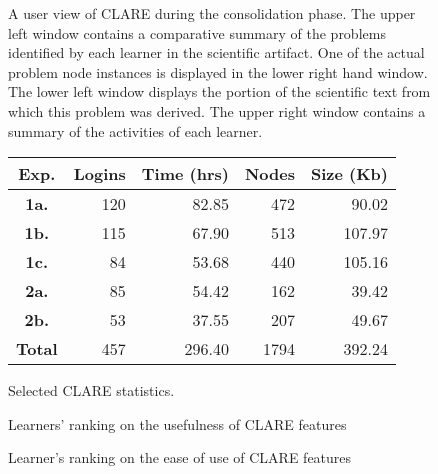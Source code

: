 \newpage
\begin{figure}[h]
  \centerline{}
  \caption{ A user view of CLARE during the consolidation phase.  The upper
  left window contains a comparative summary of the problems identified
  by each learner in the scientific artifact.  One of the actual problem
  node instances is displayed in the lower right hand window.  The lower
  left window displays the portion of the scientific text from which this
  problem was derived. The upper right window contains a summary of the
  activities of each learner.}
  \label{fig:consolidate}
\end{figure}

\newpage
\begin{figure}[h]
  \begin{center}
  \begin{tabular} {|c|r|r|r|r|} \hline   
    Exp. & Logins & Time (hrs)& Nodes & Size (Kb) \\
    \hline \hline {\bf 1a.}  & 120 & 82.85 & 472 & 90.02 \\ \hline {\bf
    1b.}  & 115 & 67.90 & 513 & 107.97 \\ \hline {\bf 1c.}  & 84 &
    53.68 & 440 & 105.16 \\ \hline {\bf 2a.}  & 85 & 54.42 & 162 &
    39.42 \\ \hline {\bf 2b.}  & 53 & 37.55 & 207 & 49.67 \\ \hline
    \hline {\bf Total} & 457 & 296.40 & 1794 & 392.24 \\ \hline
   \end{tabular}
    \caption{Selected CLARE statistics.}
     \label{fig:summary-stat}
  \end{center}
\end{figure}

\newpage
\begin{figure}[hbtp]
 \centerline{}
 \caption{Learners' ranking on the usefulness of CLARE features}
  \label{fig:usefulness}
\end{figure}

\newpage
\begin{figure}[hbtp]
  \centerline{}
 \caption{Learner's ranking on the ease of use of CLARE features}
  \label{fig:barriers}
\end{figure}


